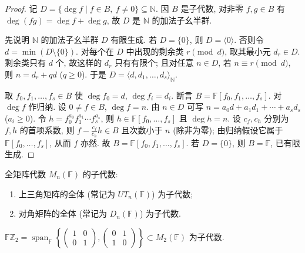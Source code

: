 \begin{proof}
记 $D=\{\deg f\mid f\in B,\ f\neq0\}\subseteq\mathbb{N}$.
因 $B$ 是子代数, 对非零 $f,g\in B$ 有 $\deg(fg)=\deg f+\deg g$, 故 $D$ 是 $\mathbb{N}$ 的加法子幺半群.

先说明 $\mathbb{N}$ 的加法子幺半群 $D$ 有限生成. 若 $D=\{0\}$, 则 $D=\langle 0\rangle$. 否则令
$d=\min(D\setminus\{0\})$. 对每个在 $D$ 中出现的剩余类 $r\pmod d$, 取其最小元 $d_r\in D$.
剩余类只有 $d$ 个, 故这样的 $d_r$ 只有有限个; 且对任意 $n\in D$, 若 $n\equiv r\pmod d$, 则
$n=d_r+qd$ ($q\ge0$). 于是 $D=\langle d,d_1,\dots,d_s\rangle_{\mathbb{N}}$.

取 $f_0,f_1,\dots,f_s\in B$ 使 $\deg f_0=d$, $\deg f_i=d_i$. 断言 $B=\mathbb{F}[f_0,f_1,\dots,f_s]$.
对 $\deg f$ 作归纳. 设 $0\neq f\in B$, $\deg f=n$. 由 $n\in D$ 可写
$n=a_0d+a_1d_1+\cdots+a_sd_s$ ($a_i\ge0$). 令 $h=f_0^{a_0}f_1^{a_1}\cdots f_s^{a_s}$, 则
$h\in\mathbb{F}[f_0,\dots,f_s]$ 且 $\deg h=n$. 设 $c_f,c_h$ 分别为 $f,h$ 的首项系数, 则
$f-\frac{c_f}{c_h}h\in B$ 且次数小于 $n$ (除非为零); 由归纳假设它属于 $\mathbb{F}[f_0,\dots,f_s]$,
从而 $f$ 亦然. 故 $B=\mathbb{F}[f_0,f_1,\dots,f_s]$. 若 $D=\{0\}$, 则 $B=\mathbb{F}$, 已有限生成.
\end{proof}

\begin{example}\label{ex:matrix-subalgebras}
全矩阵代数 $M_n(\mathbb{F})$ 的子代数:
\begin{enumerate}
  \item 上三角矩阵的全体 (常记为 $UT_n(\mathbb{F})$) 为子代数;
  \item 对角矩阵的全体 (常记为 $D_n(\mathbb{F})$) 为子代数.
\end{enumerate}
\end{example}

\begin{example}\label{ex:group-algebra-F2}
$\mathbb{F}\mathbb{Z}_2=\operatorname{span}_{\mathbb{F}}\left\{
\begin{pmatrix}1&0\\0&1\end{pmatrix},
\begin{pmatrix}0&1\\1&0\end{pmatrix}\right\}\subset M_2(\mathbb{F})$ 为子代数.
\end{example}

